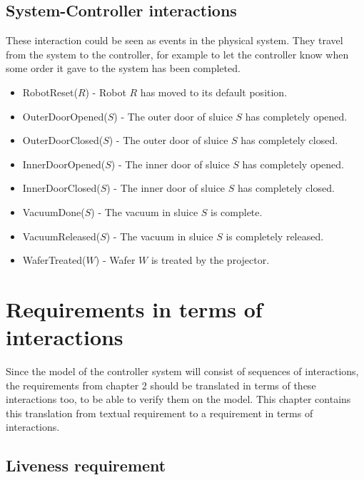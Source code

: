 \documentclass[12pt]{report}
\begin{document}
	\section{System-Controller interactions}
	These interaction could be seen as events in the physical system. They travel from the system to the controller, for example to let the controller know when some order it gave to the system has been completed.
	\begin{itemize}
\item RobotReset($R$) - Robot $R$ has moved to its default position.
\item OuterDoorOpened($S$) - The outer door of sluice $S$ has completely opened.
\item OuterDoorClosed($S$) - The outer door of sluice $S$ has completely closed.
\item InnerDoorOpened($S$) - The inner door of sluice $S$ has completely opened.
\item InnerDoorClosed($S$) - The inner door of sluice $S$ has completely closed.
\item VacuumDone($S$) - The vacuum in sluice $S$ is complete.
\item VacuumReleased($S$) - The vacuum in sluice $S$ is completely released.
\item WaferTreated($W$) - Wafer $W$ is treated by the projector.
	\end{itemize}
	
	\chapter{Requirements in terms of interactions}
	Since the model of the controller system will consist of sequences of interactions, the requirements from chapter 2 should be translated in terms of these interactions too, to be able to verify them on the model. This chapter contains this translation from textual requirement to a requirement in terms of interactions.
	\section{Liveness requirement}
	\begin{itemize}
	\end{itemize}
\end{document}
